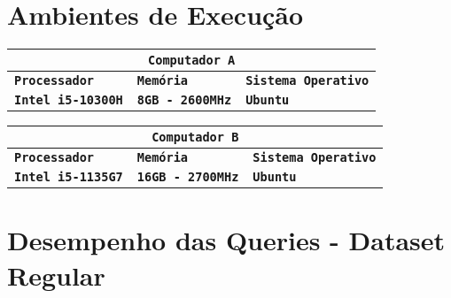 \documentclass[12pt,a4paper]{report}
\begin{document}
\section{Ambientes de Execução}

{
\setlength\arrayrulewidth{1pt}

\begin{center}
    \begin{tabular}{ |p{4.73cm}|p{4.73cm}|p{4.73cm}|  }
        \hline
        \multicolumn{3}{|c|}{\textbf{\texttt{Computador A}}} \\
        \hline
        \centering\textbf{\texttt{Processador}} & \hfil \textbf{\texttt{Memória}} & \hfil \textbf{\texttt{Sistema Operativo}} \\
        \hline
        \centering\textbf{\texttt{Intel i5-10300H}} & \hfil \texttt{\textbf{8GB - 2600MHz}} & \hfil \texttt{\textbf{Ubuntu}}\\
        \hline
    \end{tabular}
\end{center}


\vspace{10pt}

\begin{center}
    \begin{tabular}{ |p{4.73cm}|p{4.73cm}|p{4.73cm}|  }
        \hline
        \multicolumn{3}{|c|}{\textbf{\texttt{Computador B}}} \\
        \hline
        \centering\textbf{\texttt{Processador}} & \hfil \textbf{\texttt{Memória}} & \hfil \textbf{\texttt{Sistema Operativo}} \\
        \hline
        \centering\textbf{\texttt{Intel i5-1135G7}} & \hfil \texttt{\textbf{16GB - 2700MHz}} & \hfil \texttt{\textbf{Ubuntu}}\\
        \hline
    \end{tabular}
\end{center}
}


\newpage

\section{Desempenho das Queries - Dataset Regular}
\end{document}
